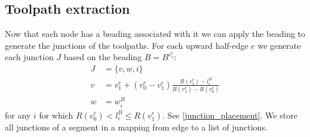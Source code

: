 \subsection{Toolpath extraction}\label{sec_toolpath_extraction}
Now that each node has a beading associated with it we can apply the beading to generate the junctions of the toolpaths.
For each upward half-edge $e$ we generate each junction $J$ based on the beading $B = B^{v_1^e}$:
\begin{align*}
J &= \{ v, w, i \} \\ 
v &= v_1^e + (v_0^e - v_1^e) \frac{R(v_1^e) - l_i^B}{R(v_1^e) - R(v_0^e)} \\ 
w &= w_i^B
\end{align*}
for any $i$ for which $R(v_0^e) < l_i^B \leq R(v_1^e)$.
See \cref{junction_placement}.
We store all junctions of a segment in a mapping from edge to a list of junctions.


